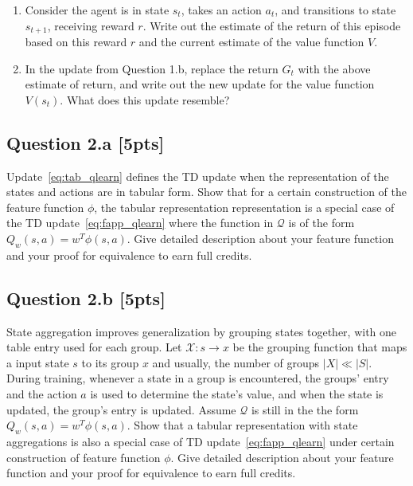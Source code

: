 \documentclass[12pt]{article}
\begin{document}
\begin{enumerate}
    \item Consider the agent is in state $s_t$, takes an action $a_t$, and transitions to state $s_{t+1}$, receiving reward $r$. Write out the estimate of the return of this episode based on this reward $r$ and the current estimate of the value function $V$. 
    \item In the update from Question 1.b, replace the return $G_t$ with the above estimate of return, and write out the new update for the value function $V(s_t)$. What does this update resemble?
\end{enumerate}

\noindent
\begin{solution}
\end{solution}


\subsection*{Question 2.a \textbf{[5pts]}}
Update~\ref{eq:tab_qlearn} defines the TD update when the representation of the states and actions are in tabular form. Show that for a certain construction of the feature function $\phi$, the tabular representation representation is a special case of the TD update~\ref{eq:fapp_qlearn} where the function in $\mathcal Q$ is of the form $Q _w(s, a) = w ^T \phi(s, a)$. Give detailed description about your feature function and your proof for equivalence to earn full credits. \\

\noindent
\begin{solution}
\end{solution}

\subsection*{Question 2.b \textbf{[5pts]}}
State aggregation improves generalization by grouping states together, with one table entry used for each group. Let $\mathcal{X}: s \to x$ be the grouping function that maps a input state $s$ to its group $x$ and usually, the number of groups $|X| \ll |S|$. During training, whenever a state in a group is encountered, the groups' entry and the action $a$ is used to determine the state's value, and when the state is updated, the group's entry is updated. Assume $\mathcal Q$ is still in the the form $Q _w(s, a) = w ^T \phi(s, a)$. Show that a tabular representation with state aggregations is also a special case of TD update~\ref{eq:fapp_qlearn} under certain construction of feature function $\phi$. Give detailed description about your feature function and your proof for equivalence to earn full credits. 
\end{document}
